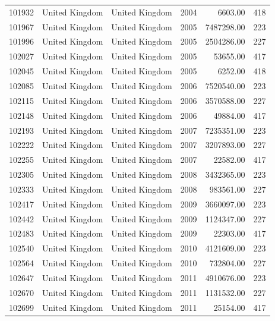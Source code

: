 \documentclass[a4paper,ngerman,oneside,titlepage,bibliography=totoc,11pt]{scrreprt}
\begin{document}
\begin{table}[ht]
\begin{tabular}{rllrrr}
  101932 & United Kingdom & United Kingdom & 2004 & 6603.00 & 418 \\ 
  101967 & United Kingdom & United Kingdom & 2005 & 7487298.00 & 223 \\ 
  101996 & United Kingdom & United Kingdom & 2005 & 2504286.00 & 227 \\ 
  102027 & United Kingdom & United Kingdom & 2005 & 53655.00 & 417 \\ 
  102045 & United Kingdom & United Kingdom & 2005 & 6252.00 & 418 \\ 
  102085 & United Kingdom & United Kingdom & 2006 & 7520540.00 & 223 \\ 
  102115 & United Kingdom & United Kingdom & 2006 & 3570588.00 & 227 \\ 
  102148 & United Kingdom & United Kingdom & 2006 & 49884.00 & 417 \\ 
  102193 & United Kingdom & United Kingdom & 2007 & 7235351.00 & 223 \\ 
  102222 & United Kingdom & United Kingdom & 2007 & 3207893.00 & 227 \\ 
  102255 & United Kingdom & United Kingdom & 2007 & 22582.00 & 417 \\ 
  102305 & United Kingdom & United Kingdom & 2008 & 3432365.00 & 223 \\ 
  102333 & United Kingdom & United Kingdom & 2008 & 983561.00 & 227 \\ 
  102417 & United Kingdom & United Kingdom & 2009 & 3660097.00 & 223 \\ 
  102442 & United Kingdom & United Kingdom & 2009 & 1124347.00 & 227 \\ 
  102483 & United Kingdom & United Kingdom & 2009 & 22303.00 & 417 \\ 
  102540 & United Kingdom & United Kingdom & 2010 & 4121609.00 & 223 \\ 
  102564 & United Kingdom & United Kingdom & 2010 & 732804.00 & 227 \\ 
  102647 & United Kingdom & United Kingdom & 2011 & 4910676.00 & 223 \\ 
  102670 & United Kingdom & United Kingdom & 2011 & 1131532.00 & 227 \\ 
  102699 & United Kingdom & United Kingdom & 2011 & 25154.00 & 417 \\ 
   \hline
\end{tabular}
\end{table}
 



\end{document}
